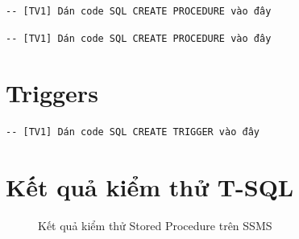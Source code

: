 \begin{lstlisting}[style=sql, caption={Stored Procedure [TênSP1]}]
-- [TV1] Dán code SQL CREATE PROCEDURE vào đây
\end{lstlisting}

\begin{lstlisting}[style=sql, caption={Stored Procedure [TênSP2]}]
-- [TV1] Dán code SQL CREATE PROCEDURE vào đây
\end{lstlisting}


\section{Triggers}\label{Sec2.7}

\begin{ex}\label{ex2.1}

\end{ex}

\begin{lstlisting}[style=sql, caption={Trigger [TênTrigger1]}]
-- [TV1] Dán code SQL CREATE TRIGGER vào đây
\end{lstlisting}

\begin{cor}

\end{cor}


\section{Kết quả kiểm thử T-SQL}\label{Sec2.8}


\begin{figure}[H]
  \centering
  \caption{Kết quả kiểm thử Stored Procedure trên SSMS}\label{fig:ssms}
\end{figure}
